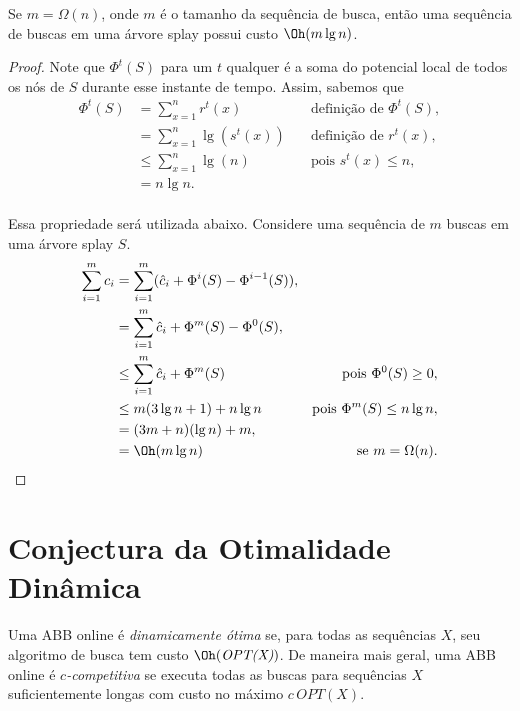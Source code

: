 \begin{theorem}
    Se $m = \Omega(n)$, onde $m$ é o tamanho da sequência de busca, então uma sequência de buscas em uma árvore splay possui custo $\Oh(m \lg n)$.
\end{theorem}

\begin{proof}
Note que $\Phi^{t}(S)$ para um $t$ qualquer é a soma do potencial local de todos os nós de $S$ durante esse instante de tempo. Assim, sabemos que 
\begin{align*}
    \Phi^{t}(S) &= \sum_{x = 1}^{n}r^{t}(x) \quad & \text{definição de $\Phi^{t}(S)$},\\
    &= \sum_{x = 1}^{n}\lg(s^{t}(x)) \quad & \text{definição de $r^{t}(x)$},\\
    &\leq \sum_{x = 1}^{n}\lg(n) \quad & \text{pois $s^{t}(x) \leq n$},\\
    &= n\lg n.\\
\end{align*}

Essa propriedade será utilizada abaixo. Considere uma sequência de $m$ buscas em uma árvore splay $S$.
\begin{align*}
    \sum_{i = 1}^{m} c_i &= \sum_{i = 1}^{m} (\hat{c}_i + \Phi^{i}(S) - \Phi^{i-1}(S)),\\
    &= \sum_{i = 1}^{m} \hat{c}_i + \Phi^{m}(S) - \Phi^{0}(S),\\
    &\leq \sum_{i = 1}^{m} \hat{c}_i + \Phi^{m}(S) \quad & \text{pois $\Phi^{0}(S) \geq 0$},\\
    &\leq m(3\lg n + 1) + n\lg n \quad & \text{pois $\Phi^{m}(S) \leq n\lg n$},\\
    &= (3m + n)(\lg n) + m, \\
    &= \Oh(m \lg n) \quad & \text{se $m = \Omega(n)$}.
\end{align*}
\end{proof}

\section{Conjectura da Otimalidade Dinâmica}

Uma ABB online é \textit{dinamicamente ótima} se, para todas as sequências $X$, seu algoritmo de busca tem custo $\Oh(\textit{OPT(X)})$. De maneira mais geral, uma ABB online é \textit{$c$-competitiva} se executa todas as buscas para sequências $X$ suficientemente longas com custo no máximo $c$\,$OPT(X)$.


